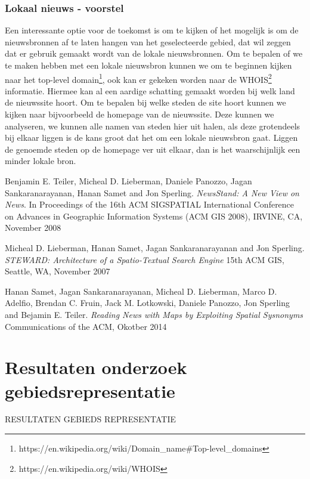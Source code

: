 \documentclass[twoside,openright]{uva-bachelor-thesis}
\begin{document}
		\subsection{Lokaal nieuws - voorstel}
			\label{sec:localnews}
			Een interessante optie voor de toekomst is om te kijken of het mogelijk is om de nieuwsbronnen af te laten hangen van het geselecteerde gebied, dat wil zeggen dat er gebruik gemaakt wordt van de lokale nieuwsbronnen. Om te bepalen of we te maken hebben met een lokale nieuwsbron kunnen we om te beginnen kijken naar het top-level domain\footnote{https://en.wikipedia.org/wiki/Domain\_name\#Top-level\_domains}, ook kan er gekeken worden naar de WHOIS\footnote{https://en.wikipedia.org/wiki/WHOIS} informatie. Hiermee kan al een aardige schatting gemaakt worden bij welk land de nieuwssite hoort. Om te bepalen bij welke steden de site hoort kunnen we kijken naar bijvoorbeeld de homepage van de nieuwssite. Deze kunnen we analyseren, we kunnen alle namen van steden hier uit halen, als deze grotendeels bij elkaar liggen is de kans groot dat het om een lokale nieuwsbron gaat. Liggen de genoemde steden op de homepage ver uit elkaar, dan is het waarschijnlijk een minder lokale bron.
\begin{thebibliography}{9}
	Benjamin E. Teiler, Micheal D. Lieberman, Daniele Panozzo, Jagan Sankaranarayanan, Hanan Samet and Jon Sperling.
	\textit{NewsStand: A New View on News}. 
	In Proceedings of the 16th ACM SIGSPATIAL International Conference on Advances in Geographic Information Systems (ACM GIS 2008), IRVINE, CA, November 2008
	
	Micheal D. Lieberman, Hanan Samet, Jagan Sankaranarayanan and Jon Sperling.
	\textit{STEWARD: Architecture of a Spatio-Textual Search Engine}
	15th ACM GIS, Seattle, WA, November 2007
	
	Hanan Samet, Jagan Sankaranarayanan, Micheal D. Lieberman, Marco D. Adelfio, Brendan C. Fruin, Jack M. Lotkowski, Daniele Panozzo, Jon Sperling and Bejamin E. Teiler.
	\textit{Reading News with Maps by Exploiting Spatial Sysnonyms}
	Communications of the ACM, Okotber 2014
\end{thebibliography}
\newpage
\appendix
\chapter{Resultaten onderzoek gebiedsrepresentatie}
\label{app:results_rep}
RESULTATEN GEBIEDS REPRESENTATIE
\end{document}
